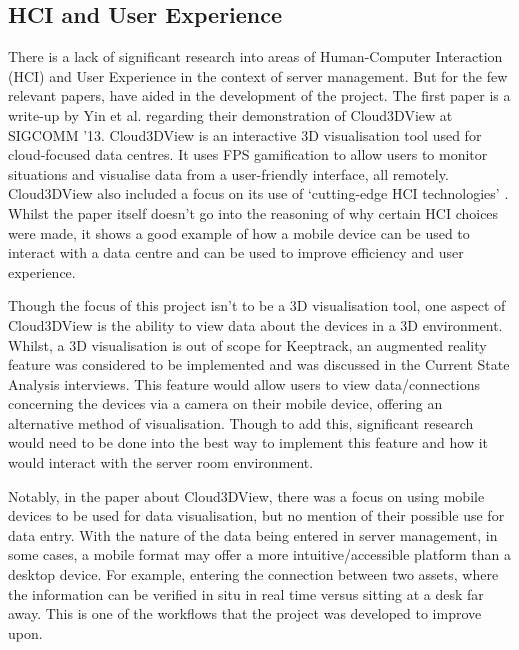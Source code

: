 \documentclass [11pt,a4paper]{article}
\begin{document}
\subsection{HCI and User Experience}
\label{sec:HCI}
There is a lack of significant research into areas of Human-Computer Interaction (HCI) and User Experience in the context of server management. But for the few relevant papers, have aided in the development of the project. The first paper is a write-up by Yin et al. \cite{cloud3dview} regarding their demonstration of Cloud3DView at SIGCOMM '13. Cloud3DView is an interactive 3D visualisation tool used for cloud-focused data centres. It uses FPS gamification to allow users to monitor situations and visualise data from a user-friendly interface, all remotely. Cloud3DView also included a focus on its use of `cutting-edge HCI technologies' \cite{cloud3dview}. Whilst the paper itself doesn't go into the reasoning of why certain HCI choices were made, it shows a good example of how a mobile device can be used to interact with a data centre and can be used to improve efficiency and user experience. 

Though the focus of this project isn't to be a 3D visualisation tool, one aspect of Cloud3DView is the ability to view data about the devices in a 3D environment. Whilst, a 3D visualisation is out of scope for Keeptrack, an augmented reality feature was considered to be implemented and was discussed in the Current State Analysis interviews. This feature would allow users to view data/connections concerning the devices via a camera on their mobile device, offering an alternative method of visualisation. Though to add this, significant research would need to be done into the best way to implement this feature and how it would interact with the server room environment.

Notably, in the paper about Cloud3DView, there was a focus on using mobile devices to be used for data visualisation, but no mention of their possible use for data entry. With the nature of the data being entered in server management, in some cases, a mobile format may offer a more intuitive/accessible platform than a desktop device. For example, entering the connection between two assets, where the information can be verified in situ in real time versus sitting at a desk far away. This is one of the workflows that the project was developed to improve upon.
\end{document}
